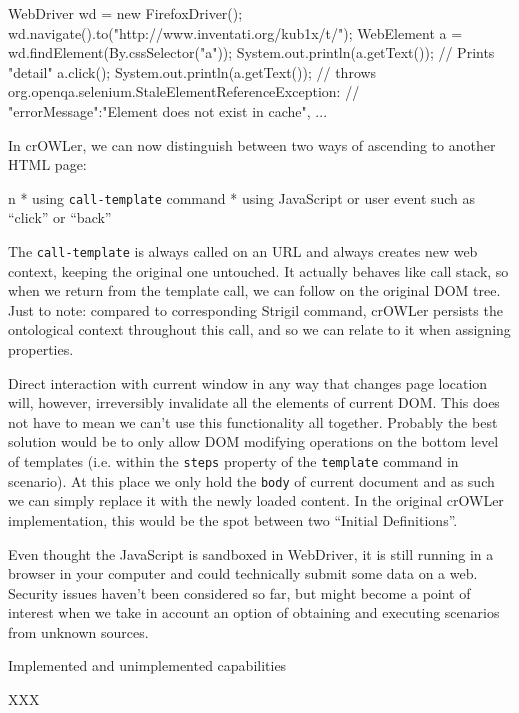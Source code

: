 \begtt
WebDriver wd = new FirefoxDriver();
wd.navigate().to("http://www.inventati.org/kub1x/t/");
WebElement a = wd.findElement(By.cssSelector("a"));
System.out.println(a.getText()); // Prints "detail"
a.click();
System.out.println(a.getText());
// throws org.openqa.selenium.StaleElementReferenceException:
// { "errorMessage":"Element does not exist in cache", ... }
\endtt

In crOWLer, we can now distinguish between two ways of ascending to another HTML page: 

\begitems \style n
  * using {\tt call-template} command
  * using JavaScript or user event such as ``click'' or ``back''
\enditems

The {\tt call-template} is always called on an URL and always creates new web
context, keeping the original one untouched. It actually behaves like call
stack, so when we return from the template call, we can follow on the original
DOM tree. Just to note: compared to corresponding Strigil command, crOWLer
persists the ontological context throughout this call, and so we can relate to it
when assigning properties. 

Direct interaction with current window in any way that changes page location
will, however, irreversibly invalidate all the elements of current DOM. This
does not have to mean we can't use this functionality all together. Probably the
best solution would be to only allow DOM modifying operations on the bottom
level of templates (i.e. within the {\tt steps} property of the {\tt template}
command in scenario). At this place we only hold the {\tt body} of current
document and as such we can simply replace it with the newly loaded content. 
In the original crOWLer implementation, this would be the spot between two
``Initial Definitions''. 

Even thought the JavaScript is sandboxed in WebDriver, it is still running in a
browser in your computer and could technically submit some data on a web.
Security issues haven't been considered so far, but might become a point of
interest when we take in account an option of obtaining and executing scenarios
from unknown sources. 


\secc Implemented and unimplemented capabilities

XXX

